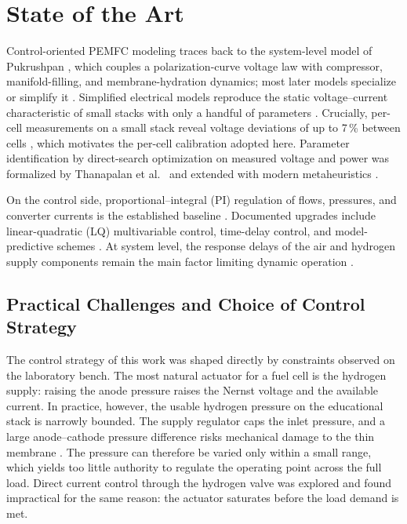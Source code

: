 \section{State of the Art}
\label{sec:sota}

Control-oriented PEMFC modeling traces back to the system-level model of
Pukrushpan \cite{pukrushpan2003}, which couples a polarization-curve voltage law
with compressor, manifold-filling, and membrane-hydration dynamics; most later
models specialize or simplify it \cite{thanapalan2008,kim2010,zhu2017}. Simplified
electrical models reproduce the static voltage--current characteristic of small
stacks with only a handful of parameters \cite{manana2006,shen2005}. Crucially,
per-cell measurements on a small stack reveal voltage deviations of up to 7\,\%
between cells \cite{manana2006}, which motivates the per-cell calibration adopted
here. Parameter identification by direct-search optimization on measured voltage
and power was formalized by Thanapalan et al.\ \cite{thanapalan2008} and extended
with modern metaheuristics \cite{cao2019}.

On the control side, proportional--integral (PI) regulation of flows, pressures,
and converter currents is the established baseline \cite{zhu2017,derbeli2017}.
Documented upgrades include linear-quadratic (LQ) multivariable control,
time-delay control, and model-predictive schemes
\cite{pukrushpan2003,kim2010,wang2021simulation}. At system level, the response
delays of the air and hydrogen supply components remain the main factor limiting
dynamic operation \cite{kharrat2025}.

\subsection{Practical Challenges and Choice of Control Strategy}
\label{sec:challenges}

The control strategy of this work was shaped directly by constraints observed on
the laboratory bench. The most natural actuator for a fuel cell is the hydrogen
supply: raising the anode pressure raises the Nernst voltage and the available
current. In practice, however, the usable hydrogen pressure on the educational
stack is narrowly bounded. The supply regulator caps the inlet pressure, and a
large anode--cathode pressure difference risks mechanical damage to the thin
membrane \cite{zhu2017,kharrat2025}. The pressure can therefore be varied only
within a small range, which yields too little authority to regulate the operating
point across the full load. Direct current control through the hydrogen valve was
explored and found impractical for the same reason: the actuator saturates before
the load demand is met.

